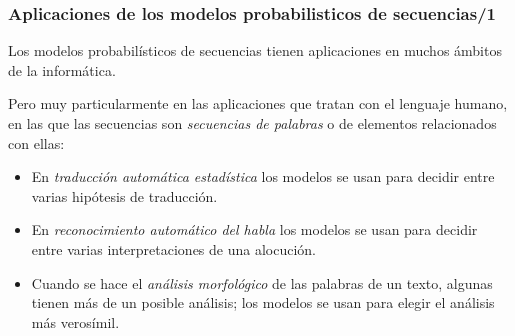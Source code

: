 \begin{frame}
  \frametitle{Aplicaciones de los modelos probabilisticos de secuencias/1}

Los modelos probabilísticos de secuencias tienen aplicaciones en muchos ámbitos de la informática.

Pero muy particularmente en las aplicaciones que tratan con el
lenguaje humano, en las que las secuencias son \emph{secuencias de
  palabras} o de elementos relacionados con ellas:
\begin{itemize}
\item En \emph{traducción automática estadística} los modelos se usan para decidir entre varias hipótesis de traducción.
\item En \emph{reconocimiento automático del habla} los modelos se usan para decidir entre varias interpretaciones de una alocución.
\item Cuando se hace el \emph{análisis morfológico} de las palabras de
  un texto, algunas tienen más de un posible análisis; los modelos se
  usan para elegir el análisis más verosímil.
\end{itemize}

\end{frame}

